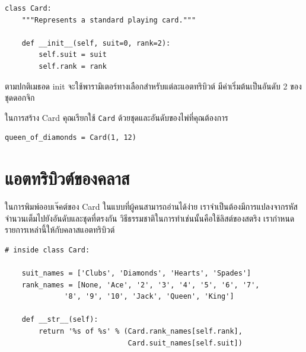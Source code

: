 \begin{verbatim}
class Card:
    """Represents a standard playing card."""

    def __init__(self, suit=0, rank=2):
        self.suit = suit
        self.rank = rank
\end{verbatim}
%

ตามปกติเมธอด init จะใช้พารามิเตอร์ทางเลือกสำหรับแต่ละแอตทริบิวต์ มีค่าเริ่มต้นเป็นอันดับ 2 ของชุดดอกจิก



ในการสร้าง Card คุณเรียกใช้ {\tt Card} ด้วยชุดและอันดับของไพ่ที่คุณต้องการ

\begin{verbatim}
queen_of_diamonds = Card(1, 12)
\end{verbatim}
%


\section{แอตทริบิวต์ของคลาส} %
\label{class.attribute}


ในการพิมพ์ออบเจ๊คต์ของ Card ในแบบที่ผู้คนสามารถอ่านได้ง่าย เราจำเป็นต้องมีการแปลงจากรหัสจำนวนเต็มไปยังอันดับและชุดที่ตรงกัน
วิธีธรรมชาติในการทำเช่นนั้นคือใช้ลิสต์ของสตริง เรากำหนดรายการเหล่านี้ให้กับคลาสแอตทริบิวต์

\begin{verbatim}
# inside class Card:

    suit_names = ['Clubs', 'Diamonds', 'Hearts', 'Spades']
    rank_names = [None, 'Ace', '2', '3', '4', '5', '6', '7', 
              '8', '9', '10', 'Jack', 'Queen', 'King']

    def __str__(self):
        return '%s of %s' % (Card.rank_names[self.rank],
                             Card.suit_names[self.suit])
\end{verbatim}
%

